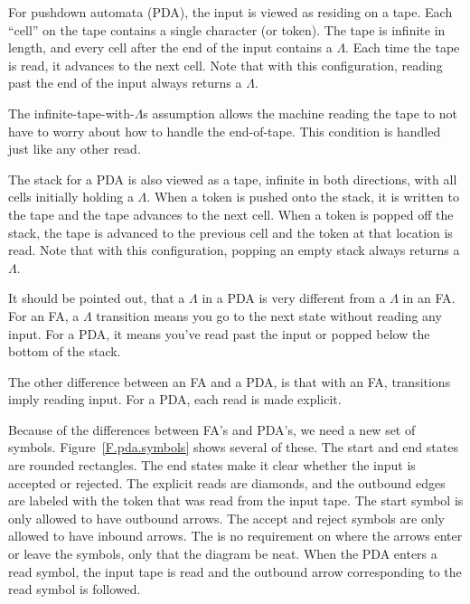 \documentclass[letterpaper,12pt,openany,reqno]{book}%
\begin{document}
For pushdown automata (PDA), the input is viewed as residing on a tape. Each ``cell'' on the tape contains a single character (or token). The tape is infinite in length, and every cell after the end of the input contains a $\Lambda$. Each time the tape is read, it advances to the next cell. Note that with this configuration, reading past the end of the input always returns a $\Lambda$.

The infinite-tape-with-$\Lambda$s assumption allows the machine reading the tape to not have to worry about how to handle the end-of-tape. This condition is handled just like any other read.

The stack for a PDA is also viewed as a tape, infinite in both directions, with all cells initially holding a $\Lambda$. When a token is pushed onto the stack, it is written to the tape and the tape advances to the next cell. When a token is popped off the stack, the tape is advanced to the previous cell and the token at that location is read. Note that with this configuration, popping an empty stack always returns a $\Lambda$.

It should be pointed out, that a $\Lambda$ in a PDA is very different from a $\Lambda$ in an FA. For an FA, a $\Lambda$ transition means you go to the next state without reading any input. For a PDA, it means you've read past the input or popped below the bottom of the stack.

The other difference between an FA and a PDA, is that with an FA, transitions imply reading input. For a PDA, each read is made explicit.

Because of the differences between FA's and PDA's, we need a new set of symbols. Figure~\ref{F.pda.symbols} shows several of these. The start and end states are rounded rectangles. The end states make it clear whether the input is accepted or rejected. The explicit reads are diamonds, and the outbound edges are labeled with the token that was read from the input tape. The start symbol is only allowed to have outbound arrows. The accept and reject symbols are only allowed to have inbound arrows. The is no requirement on where the arrows enter or leave the symbols, only that the diagram be neat. When the PDA enters a read symbol, the input tape is read and the outbound arrow corresponding to the read symbol is followed.
\end{document}
